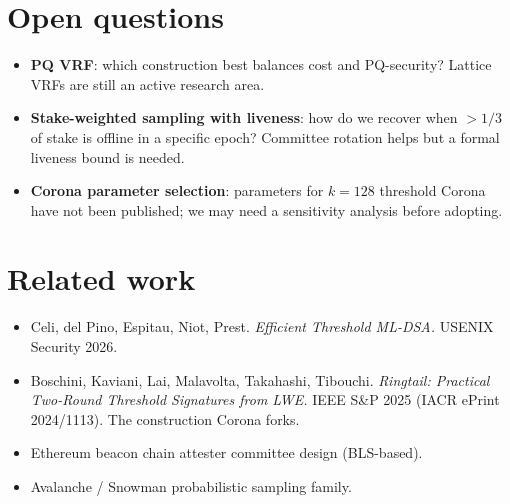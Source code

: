 \documentclass[11pt]{article}
\begin{document}
\section{Open questions}

\begin{itemize}
  \item \textbf{PQ VRF}: which construction best balances cost and
        PQ-security? Lattice VRFs are still an active research area.
  \item \textbf{Stake-weighted sampling with liveness}: how do we
        recover when $>1/3$ of stake is offline in a specific epoch?
        Committee rotation helps but a formal liveness bound is needed.
  \item \textbf{Corona parameter selection}: parameters for
        $k = 128$ threshold Corona have not been published; we may
        need a sensitivity analysis before adopting.
\end{itemize}

\section{Related work}

\begin{itemize}
  \item Celi, del Pino, Espitau, Niot, Prest.
        \emph{Efficient Threshold ML-DSA.} USENIX Security 2026.
  \item Boschini, Kaviani, Lai, Malavolta, Takahashi, Tibouchi.
        \emph{Ringtail: Practical Two-Round Threshold Signatures from
        LWE.} IEEE S\&P 2025 (IACR ePrint 2024/1113). The construction
        Corona forks.
  \item Ethereum beacon chain attester committee design (BLS-based).
  \item Avalanche / Snowman probabilistic sampling family.
\end{itemize}
\end{document}
